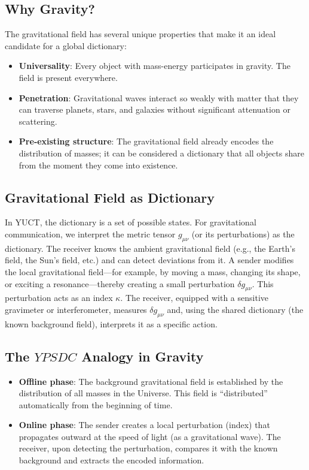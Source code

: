\documentclass[12pt,a4paper]{article}
\newcommand{\YPSDC}{YPSDC}
\begin{document}
	\subsection{Why Gravity?}
	
	The gravitational field has several unique properties that make it an ideal candidate for a global dictionary:
	\begin{itemize}
		\item \textbf{Universality}: Every object with mass-energy participates in gravity. The field is present everywhere.
		\item \textbf{Penetration}: Gravitational waves interact so weakly with matter that they can traverse planets, stars, and galaxies without significant attenuation or scattering.
		\item \textbf{Pre‑existing structure}: The gravitational field already encodes the distribution of masses; it can be considered a dictionary that all objects share from the moment they come into existence.
	\end{itemize}
	
	\subsection{Gravitational Field as Dictionary}
	
	In YUCT, the dictionary is a set of possible states. For gravitational communication, we interpret the metric tensor \(g_{\mu\nu}\) (or its perturbations) as the dictionary. The receiver knows the ambient gravitational field (e.g., the Earth’s field, the Sun’s field, etc.) and can detect deviations from it. A sender modifies the local gravitational field—for example, by moving a mass, changing its shape, or exciting a resonance—thereby creating a small perturbation \(\delta g_{\mu\nu}\). This perturbation acts as an index \(\kappa\). The receiver, equipped with a sensitive gravimeter or interferometer, measures \(\delta g_{\mu\nu}\) and, using the shared dictionary (the known background field), interprets it as a specific action.
	
	\subsection{The \(\YPSDC\) Analogy in Gravity}
	
	\begin{itemize}
		\item \textbf{Offline phase}: The background gravitational field is established by the distribution of all masses in the Universe. This field is “distributed” automatically from the beginning of time.
		\item \textbf{Online phase}: The sender creates a local perturbation (index) that propagates outward at the speed of light (as a gravitational wave). The receiver, upon detecting the perturbation, compares it with the known background and extracts the encoded information.
	\end{itemize}
	
\end{document}
